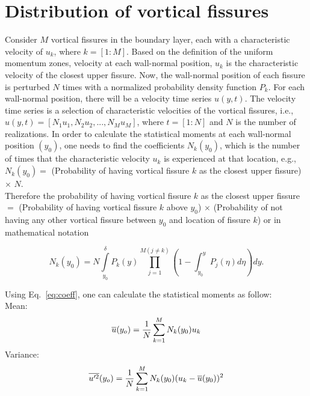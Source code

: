 \documentclass[aps,reprint,amsmath,amssymb,pra]{revtex4-1}%
\begin{document}
\section{Distribution of vortical fissures\label{append:mathmodel}}
Consider $M$ vortical fissures in the boundary layer, each with a characteristic velocity of $u_k$, where $k=[1:M]$. Based on the definition of the uniform momentum zones, velocity at each wall-normal position, $u_k$ is the characteristic velocity of the closest upper fissure. Now, the wall-normal position of each fissure is perturbed $N$ times with a normalized probability density function $P_k$. For each wall-normal position, there will be a velocity time series $u(y,t)$. The velocity time series is a selection of characteristic velocities of the vortical fissures, i.e., $u(y,t) = [N_1u_1, N_2u_2, ..., N_Mu_M]$, where $t = [1:N]$ and $N$ is the number of realizations. In order to calculate the statistical moments at each wall-normal position $(y_0)$, one needs to find the coefficients $N_k(y_0)$, which is the number of times that the characteristic velocity $u_k$ is experienced at that location, e.g.,\\

$N_k(y_0)=$ (Probability of having vortical fissure $k$ as the closest upper fissure) $\times$ $N$.\\

Therefore the probability of having vortical fissure $k$ as the closest upper fissure $=$ (Probability of having vortical fissure $k$ above $y_0$) $\times$ (Probability of not having any other vortical fissure between $y_0$ and location of fissure $k$) or in mathematical notation

\begin{equation}\label{eq:coeff}
N_k(y_0) = N\int\limits_{y_0}^\delta P_k(y) \prod\limits_{j = 1}^{M(j\neq k)}\left(1-\int_{y_0}^y P_j(\eta)d\eta\right)dy.
\end{equation}

Using Eq.~\ref{eq:coeff}, one can calculate the statistical moments as follow:\\
Mean:
\begin{equation}
\overline{u}(y_o) = \frac{1}{N}\sum\limits_{k=1}^{M}N_k(y_0)u_k\\
\label{eq:mean}
\end{equation}
Variance:\\
\begin{equation}
\overline{u'^2}(y_o) = \frac{1}{N}\sum\limits_{k=1}^{M}N_k(y_0)(u_k-\overline{u}(y_0))^2\\
\label{eq:var}
\end{equation}
\end{document}
